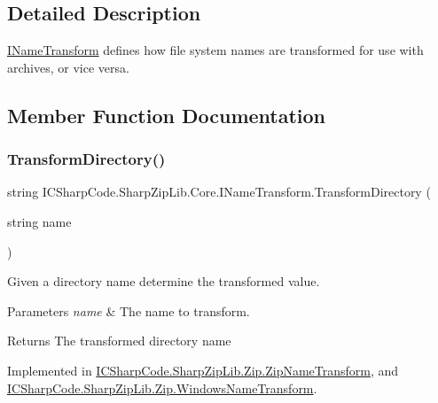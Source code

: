\subsection{Detailed Description}
\hyperlink{interface_i_c_sharp_code_1_1_sharp_zip_lib_1_1_core_1_1_i_name_transform}{I\+Name\+Transform} defines how file system names are transformed for use with archives, or vice versa. 



\subsection{Member Function Documentation}
\mbox{\label{interface_i_c_sharp_code_1_1_sharp_zip_lib_1_1_core_1_1_i_name_transform_a8052780160a8d458799e014aa8308c78}} 
\subsubsection{\texorpdfstring{Transform\+Directory()}{TransformDirectory()}}
{\footnotesize\ttfamily string I\+C\+Sharp\+Code.\+Sharp\+Zip\+Lib.\+Core.\+I\+Name\+Transform.\+Transform\+Directory (\begin{DoxyParamCaption}\item[{string}]{name }\end{DoxyParamCaption})}



Given a directory name determine the transformed value. 


\begin{DoxyParams}{Parameters}
{\em name} & The name to transform.\\
\hline
\end{DoxyParams}
\begin{DoxyReturn}{Returns}
The transformed directory name
\end{DoxyReturn}


Implemented in \hyperlink{class_i_c_sharp_code_1_1_sharp_zip_lib_1_1_zip_1_1_zip_name_transform_ac5ce9344a3eed6817a8e8a67e9d12bfe}{I\+C\+Sharp\+Code.\+Sharp\+Zip\+Lib.\+Zip.\+Zip\+Name\+Transform}, and \hyperlink{class_i_c_sharp_code_1_1_sharp_zip_lib_1_1_zip_1_1_windows_name_transform_ac685f10a51ab041a6dd92da7729ff500}{I\+C\+Sharp\+Code.\+Sharp\+Zip\+Lib.\+Zip.\+Windows\+Name\+Transform}.

